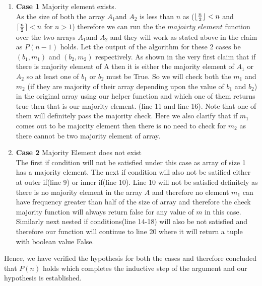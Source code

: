 \documentclass[answers]{exam}
\begin{document}
\begin{questions}
\begin{parts}
\begin{solution}
\begin{enumerate}
\item \textbf{Case 1} Majority element exists.\\
As the size of both the array $A_{1} $and $ A_{2} $ is less than $n$ as ($\lfloor\frac{n}{2}\rfloor <n$ and $\lceil\frac{n}{2}\rceil <n$ for $n>1$) therefore we can run the the $majoirty\_element$ function over the two arrays $A_{1} $and $ A_{2} $ and they will work as stated above in the claim as $P(n-1)$ holds. Let the output of the algorithm for these 2 cases be $(b_{1},m_{1})$ and $(b_{2},m_{2})$ respectively. As shown in the very first claim that if there is majority element of A then it is either the majority element of $A_{1}$ or $ A_{2}$ so at least one of $b_1$ or $b_2$ must be True. So we will check both the $m_{1}$ and $m_{2}$ (if they are majority of their array depending upon the value of $b_{1}$ and $b_{2}$) in the original array using our helper function and which one of them returns true then that is our majority element. (line 11 and line 16). Note that one of them will definitely pass the majority check. Here we also clarify that if $m_{1}$ comes out to be majority element then there is no need to check for $m_{2}$ as there cannot be two majority element of array.

\item \textbf{Case 2} Majority Element does not exist\\
The first if condition will not be satisfied under this case as array of size 1 has a majority element. The next if condition will also not be satified either at outer if(line 9) or inner if(line 10). Line 10 will not be satisfied definitely as there is no majority element in the array $A$ and therefore no element $m_1$ can have frequency greater than half of the size of array and therefore the check majority function will always return false for any value of $m$ in this case. Similarly next nested if conditions(line 14-18) will also be not satisfied and therefore our function will continue to line 20 where it will return a tuple with boolean value False.
\end{enumerate}

Hence, we have verified the hypothesis for both the cases and therefore concluded that $P(n)$ holds which completes the inductive step of the argument and our hypothesis is established.


\end{solution}
\end{parts}
\end{questions}
\end{document}
